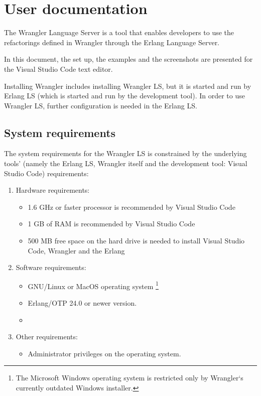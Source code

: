 \chapter{User documentation}
\label{ch:user}

The Wrangler Language Server is a tool that enables developers to use the refactorings defined in Wrangler through the Erlang Language Server.

In this document, the set up, the examples and the screenshots are presented for the Visual Studio Code text editor.

Installing Wrangler includes installing Wrangler LS, but it is started and run by Erlang LS (which is started and run by the development tool).
In order to use Wrangler LS, further configuration is needed in the Erlang LS.

\section{System requirements}

The system requirements for the Wrangler LS is constrained by the underlying tools' (namely the Erlang LS, Wrangler itself and the development tool: Visual Studio Code) requirements:

\begin{enumerate}
    \item Hardware requirements: 
    \begin{itemize}
        \item 1.6 GHz or faster processor is recommended by Visual Studio Code
        \cite{VSCodeRequirements}
        \item 1 GB of RAM is recommended by Visual Studio Code \cite{VSCodeRequirements}
        \item 500 MB free space on the hard drive is needed to install Visual Studio Code, Wrangler and the Erlang
    \end{itemize}
    \item Software requirements:
    \begin{itemize}
        \item GNU/Linux or MacOS operating system \footnote{The Microsoft Windows operating system is restricted only by Wrangler`s currently outdated Windows installer.}
        \item Erlang/OTP 24.0 or newer version.
        \item {}
    \end{itemize}
    \item Other requirements:
    \begin{itemize}
        \item Administrator privileges on the operating system.
    \end{itemize}
\end{enumerate}


